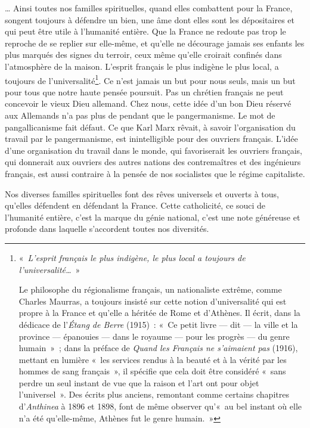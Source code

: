 \documentclass[french,twoside]{book} %
\newcommand\chapterclose{} %
\begin{document}
… Ainsi toutes nos familles spirituelles, quand elles combattent pour la France, songent toujours à défendre un bien, une âme dont elles sont les dépositaires et qui peut être utile à l’humanité entière. Que la France ne redoute pas trop le reproche de se replier sur elle-même, et qu’elle ne décourage jamais ses enfants les plus marqués des signes du terroir, ceux même qu’elle croirait confinés dans l’atmosphère de la maison. L’esprit français le plus indigène le plus local, a toujours de l’universalité\footnote{\noindent « {\itshape L’esprit français le plus indigène, le plus local a toujours de l’universalité…} »‌\par
 Le philosophe du régionalisme français, un nationaliste extrême, comme Charles Maurras, a toujours insisté sur cette notion d’universalité qui est propre à la France et qu’elle a héritée de Rome et d’Athènes. Il écrit, dans la dédicace de l’{\itshape Étang de Berre} (1915) : « Ce petit livre — dit — la ville et la province — épanouies — dans le royaume — pour les progrès — du genre humain » ; dans la préface de {\itshape Quand les Français ne s’aimaient pas} (1916), mettant en lumière « les services rendus à la beauté et à la vérité par les hommes de sang français », il spécifie que cela doit être considéré « sans perdre un seul instant de vue que la raison et l’art ont pour objet l’universel ». Des écrits plus anciens, remontant comme certains chapitres d’{\itshape Anthinea} à 1896 et 1898, font de même observer qu’« au bel instant où elle n’a été qu’elle-même, Athènes fut le genre humain. »
 }. Ce n’est jamais un but pour nous seuls, mais un but pour tous que notre haute pensée poursuit. Pas un chrétien français ne peut concevoir le vieux Dieu allemand. Chez nous, cette idée d’un bon Dieu réservé aux Allemands n’a pas plus de pendant que le pangermanisme. Le mot de pangallicanisme fait défaut. Ce que Karl Marx rêvait, à savoir l’organisation du travail par le pangermanisme, est inintelligible pour des ouvriers français. L’idée d’une organisation du travail dans le monde, qui favoriserait les ouvriers français, qui donnerait aux ouvriers des autres nations des contremaîtres et des ingénieurs français, est aussi contraire à la pensée de nos socialistes que le régime capitaliste.‌\par
Nos diverses familles spirituelles font des rêves universels et ouverts à tous, qu’elles défendent en défendant la France. Cette catholicité, ce souci de l’humanité entière, c’est la marque du génie national, c’est une note généreuse et profonde dans laquelle s’accordent toutes nos diversités.‌
\chapterclose
\end{document}
